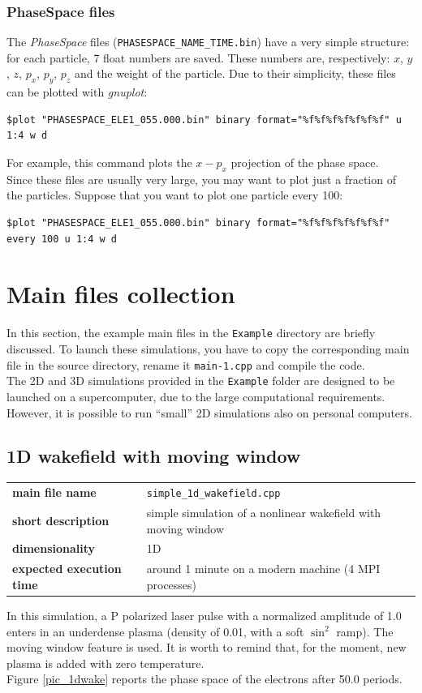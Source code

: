 \documentclass[11pt,a4paper]{report}
\begin{document}
\subsection{PhaseSpace files}
The \emph{PhaseSpace} files (\verb+PHASESPACE_NAME_TIME.bin+) have a very simple structure: for each particle, 7 float numbers are saved. These numbers are, respectively: $x$, $y$, $z$, $p_x$, $p_y$, $p_z$ and the weight of the particle. Due to their simplicity, these files can be plotted with \emph{gnuplot}: 
\begin{verbatim}
$plot "PHASESPACE_ELE1_055.000.bin" binary format="%f%f%f%f%f%f%f" u 1:4 w d
\end{verbatim}
For example, this command plots the $x-p_x$ projection of the phase space.\\
Since these files are usually very large, you may want to plot just a fraction of the particles. Suppose that you want to plot one particle every 100:
\begin{verbatim}
$plot "PHASESPACE_ELE1_055.000.bin" binary format="%f%f%f%f%f%f%f" every 100 u 1:4 w d
\end{verbatim} 

\chapter{Main files collection}
In this section, the example main files in the \verb+Example+ directory are briefly discussed. To launch these simulations, you have to copy the corresponding main file in the source directory, rename it \verb+main-1.cpp+ and compile the code.\\
The 2D and 3D simulations provided in the \verb+Example+ folder are designed to be launched on a supercomputer, due to the large computational requirements. However, it is possible to run ``small'' 2D simulations also on personal computers. 

\section{1D wakefield with moving window}
\begin{center}
    \begin{tabular}{ l | l }
    	\textbf{main file name} & \verb+simple_1d_wakefield.cpp+\\
    	\textbf{short description} & simple simulation of a nonlinear wakefield with moving window \\
    	\textbf{dimensionality} & 1D  \\
    	\textbf{expected execution time} & around 1 minute on a modern machine (4 MPI processes)
    \end{tabular}
    \end{center}
In this simulation, a P polarized laser pulse with a normalized amplitude of 1.0 enters in an underdense plasma (density of 0.01, with a soft $\sin^2$ ramp). The moving window feature is used. It is worth to remind that, for the moment, new plasma is added with zero temperature.\\
Figure \ref{pic_1dwake} reports the phase space of the electrons after 50.0 periods.
    
\end{document}
